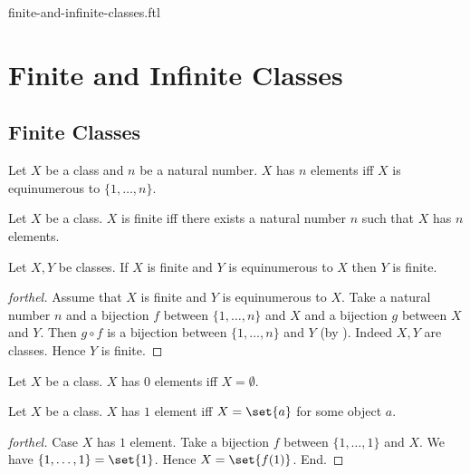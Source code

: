 \documentclass{naproche-library}
\begin{document}
\begin{smodule}{finite-and-infinite-classes.ftl}

  \section*{Finite and Infinite Classes}

  \subsection*{Finite Classes}

  \begin{definition}[forthel,id=FOUNDATIONS_14_3512046897512410,printid]
    Let $X$ be a class and $n$ be a natural number.
    $X$ has $n$ elements iff $X$ is equinumerous to $\{ 1, \dots, n \}$.
  \end{definition}

  \begin{definition}[forthel,id=FOUNDATIONS_14_3694156977274880,printid]
    Let $X$ be a class.
    $X$ is finite iff there exists a natural number $n$ such that $X$ has $n$ elements.
  \end{definition}

  \begin{proposition}[forthel,id=FOUNDATIONS_14_3929085203972096,printid]
    Let $X, Y$ be classes.
    If $X$ is finite and $Y$ is equinumerous to $X$ then $Y$ is finite.
  \end{proposition}
  \begin{proof}[forthel]
    Assume that $X$ is finite and $Y$ is equinumerous to $X$.
    Take a natural number $n$ and a bijection $f$ between $\{ 1, \dots, n \}$ and $X$ and a bijection $g$ between $X$ and $Y$.
    Then $g \circ f$ is a bijection between $\{ 1, \dots, n \}$ and $Y$ (by ).
    Indeed $X, Y$ are classes.
    Hence $Y$ is finite.
  \end{proof}

  \begin{proposition}[forthel,id=FOUNDATIONS_14_5132547854597502,printid]
    Let $X$ be a class.
    $X$ has $0$ elements iff $X = \emptyset$.
  \end{proposition}

  \begin{proposition}[forthel,id=FOUNDATIONS_14_6812054297034125,printid]
    Let $X$ be a class.
    $X$ has $1$ element iff $X = \set{a}$ for some object $a$.
  \end{proposition}
  \begin{proof}[forthel]
    Case $X$ has $1$ element.
      Take a bijection $f$ between $\{ 1, \dots, 1 \}$ and $X$.
      We have $\{ 1, \dots, 1 \} = \set{1}$.
      Hence $X = \set{f(1)}$.
    End.


\end{proof}
\end{smodule}
\end{document}
